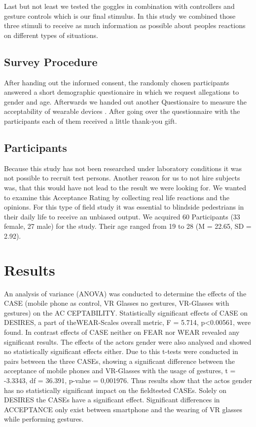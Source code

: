 \documentclass[sigchi]{acmart}
\begin{document}
 Last but not least we tested the goggles in combination with controllers and gesture controls which is our final stimulus. In this study we combined those three stimuli to receive as much information as possible about peoples reactions on different types of situations.

\subsection{Survey Procedure}

After handing out the informed consent, the randomly chosen participants answered a short demographic questionaire in which we request allegations to gender and age. Afterwards we handed out another Questionaire to measure the acceptability of wearable devices \cite{kelly2016wear}. After going over the questionnaire with the participants each of them received a little thank-you gift.

\subsection{Participants}

Because this study has not been researched under laboratory conditions it was not possible to recruit test persons. Another reason for us to not hire subjects was, that this would have not lead to the result we were looking for. We wanted to examine this Acceptance Rating by collecting real life reactions and the opinions. For this type of field study it was essential to blindside pedestrians in their daily life to receive an unbiased output. We acquired 60 Participants (33 female, 27 male) for the study. Their age ranged from 19 to 28 (M = 22.65, SD = 2.92).

\section {Results}
An analysis of variance (ANOVA) was conducted to determine the effects of the CASE (mobile phone as control, VR Glasses no gestures, VR-Glasses with gestures) on the AC CEPTABILITY. Statistically significant effects of CASE on DESIRES, a part of theWEAR-Scales overall metric, F = 5.714, p<0.00561, were found. In contrast effects of CASE neither on FEAR nor WEAR revealed any significant results. The effects of the actors gender were also analysed and showed no statistically significant effects either. Due to this t-tests were conducted in pairs between the three CASEs, showing a significant difference between the acceptance of mobile phones and VR-Glasses with the usage of gestures, t = -3.3343, df = 36.391, p-value = 0,001976. Thus results show that the actos gender has no statistically significant impact on the fieldtested CASEs. Solely on DESIRES the CASEs have a significant effect. Significant differences in ACCEPTANCE only exist between smartphone and the wearing of VR glasses while performing gestures.
\end{document}
